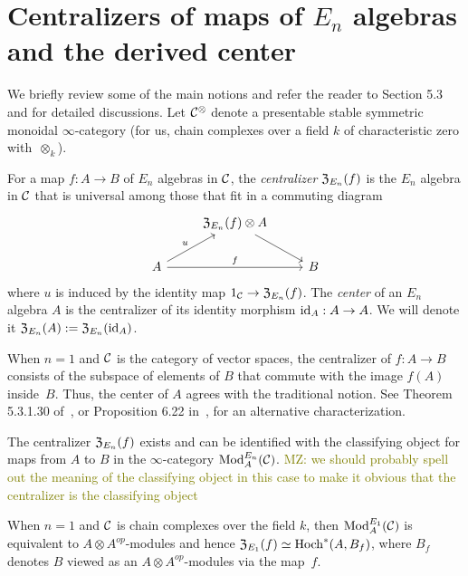 \documentclass[11pt]{amsart}
\numberwithin{equation}{section}
\def\mahmoud{\textcolor{olive}{MZ: }\textcolor{olive}}
\begin{document}
\section{Centralizers of maps of $E_n$ algebras and the derived center}
\label{sec: centralizer}

We briefly review some of the main notions and refer the reader to \cite{LurieHA} Section 5.3 and \cite{FrancisHH} for detailed discussions. Let $\mathcal C^\otimes$ denote a presentable stable symmetric monoidal $\infty$-category (for us, chain complexes over a field $k$ of characteristic zero with~$\otimes_k$).

\begin{dfn}\label{D:centralizer}
For a map $f: A \to B$ of $E_n$ algebras in $\mathcal C$, 
the {\em centralizer} ${\frak Z}_{E_n}(f)$ is the $E_n$ algebra in $\mathcal C$ that is universal among those that fit in a commuting diagram
\[
\begin{tikzcd}
& {\frak Z}_{E_n}(f) \otimes A \arrow[dr] & \\
A \arrow[ur, "u"] \arrow[rr, "f"] && B
\end{tikzcd}
\]
where $u$ is induced by the identity map $1_\mathcal C \to {\frak Z}_{E_n}(f)$.
The {\em center} of an $E_n$ algebra $A$ is the centralizer of its identity morphism ${\rm id}_A: A \to A$. We will denote it ${\frak Z}_{E_n}(A) 
:= {\frak Z}_{E_n}({\rm id}_A)$.
\end{dfn}
When $n=1$ and $\mathcal C$ is the category of vector spaces, the centralizer of $f: A \to B$ consists of the subspace of elements of $B$ that commute with the image $f(A)$ inside~$B$. Thus, the center of $A$ agrees with the traditional notion. See Theorem 5.3.1.30 of~\cite{LurieHA}, or Proposition 6.22 in~\cite{GTZ3}, for an alternative characterization.

\begin{prp}\label{T:centralizer=inthom} 
The centralizer ${\frak Z}_{E_n}(f)$ exists and can be identified with the classifying object for maps from $A$ to $B$ in the $\infty$-category ${\rm Mod}^{E_n}_A(\mathcal C)$. \mahmoud{we should probably spell out the meaning of the classifying object in this case to make it obvious that the centralizer is the classifying object}
\end{prp} 

When $n=1$ and $\mathcal C$ is chain complexes over the field $k$, then ${\rm Mod}^{E_1}_A(\mathcal C)$ is equivalent to $A\otimes A^{op}$-modules and hence ${\frak Z}_{E_1}(f) \simeq {\rm Hoch}^*(A,B_f)$,
where $B_f$ denotes $B$ viewed as an $A\otimes A^{op}$-modules via the map~$f$.
\end{document}
